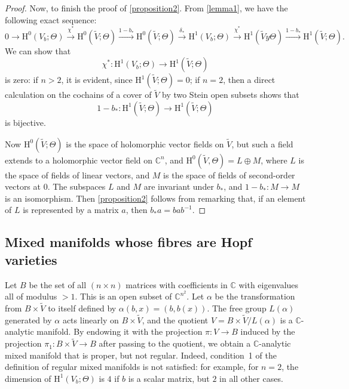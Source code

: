 \documentclass{article}
\theoremstyle{plain}
\theoremstyle{definition}
\newcommand{\CC}{\mathbb{C}}
\newcommand{\HH}{\mathrm{H}}
\newcommand{\oldpage}[1]{\marginpar{\footnotesize$\Big\vert$ \textit{p.~#1}}}
\begin{document}
\begin{proof}
  Now, to finish the proof of \cref{proposition2}.
  From \cref{lemma1}, we have the following exact sequence:
  \[
    0
    \to \HH^0(V_b;\Theta)
    \xrightarrow{\chi^*} \HH^0(\widetilde{V};\Theta)
    \xrightarrow{1-b_*} \HH^0(\widetilde{V};\Theta)
    \xrightarrow{\delta_*} \HH^1(V_b;\Theta)
    \xrightarrow{\chi^*} \HH^1(\widetilde{V}y\Theta)
    \xrightarrow{1-b_*} \HH^1(\widetilde{V};\Theta).
  \]
  We can show that
  \[
    \chi^*\colon \HH^1(V_b;\Theta) \to \HH^1(\widetilde{V};\Theta)
  \]
  is zero:
  if $n>2$, it is evident, since $\HH^1(\widetilde{V};\Theta)=0$;
  if $n=2$, then a direct calculation on the cochains of a cover of $\widetilde{V}$ by two Stein open subsets shows that
  \[
    1-b_*\colon \HH^1(\widetilde{V};\Theta) \to \HH^1(\widetilde{V};\Theta)
  \]
  is bijective.

  Now $\HH^0(\widetilde{V};\Theta)$ is the space of holomorphic vector fields on $\widetilde{V}$, but such a field extends to a holomorphic vector field on $\CC^n$, and $\HH^0(\widetilde{V},\Theta)=L\oplus M$, where $L$ is the space of fields of linear vectors, and $M$ is the space of fields of second-order vectors at $0$.
  The subspaces $L$ and $M$ are invariant under $b_*$, and $1-b_*\colon M\to M$ is an isomorphism.
  Then \cref{proposition2} follows from remarking that, if an element of $L$ is represented by a matrix $a$, then $b_*a=bab^{-1}$.
\end{proof}


\subsection{Mixed manifolds whose fibres are Hopf varieties}
\label{III.2}

\oldpage{3-06}
Let $B$ be the set of all $(n\times n)$ matrices with coefficients in $\CC$ with eigenvalues all of modulus $>1$.
This is an open subset of $\CC^{n^2}$.
Let $\alpha$ be the transformation from $B\times\widetilde{V}$ to itself defined by $\alpha(b,x)=(b,b(x))$.
The free group $L(\alpha)$ generated by $\alpha$ acts linearly on $B\times\widetilde{V}$, and the quotient $V=B\times\widetilde{V}/L(\alpha)$ is a $\CC$-analytic manifold.
By endowing it with the projection $\pi\colon V\to B$ induced by the projection $\pi_1\colon B\times\widetilde{V}\to B$ after passing to the quotient, we obtain a $\CC$-analytic mixed manifold that is proper, but not regular.
Indeed, condition~1 of the definition of regular mixed manifolds is not satisfied: for example, for $n=2$, the dimension of $\HH^1(V_b;\Theta)$ is $4$ if $b$ is a scalar matrix, but $2$ in all other cases.
\end{document}
